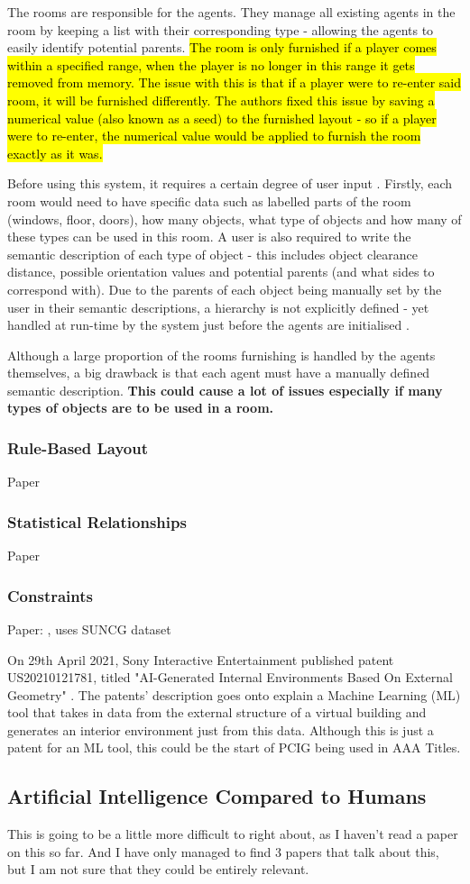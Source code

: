 The rooms are responsible for the agents. They manage all existing agents in the room by keeping a list with their corresponding type - allowing the agents to easily identify potential parents. \hl{The room is only furnished if a player comes within a specified range, when the player is no longer in this range it gets removed from memory. The issue with this is that if a player were to re-enter said room, it will be furnished differently. The authors fixed this issue by saving a numerical value (also known as a seed) to the furnished layout - so if a player were to re-enter, the numerical value would be applied to furnish the room exactly as it was.}

Before using this system, it requires a certain degree of user input \cite{real-time-walkthroughs}. Firstly, each room would need to have specific data such as labelled parts of the room (windows, floor, doors), how many objects, what type of objects and how many of these types can be used in this room.
A user is also required to write the semantic description of each type of object - this includes object clearance distance, possible orientation values and potential parents (and what sides to correspond with).
Due to the parents of each object being manually set by the user in their semantic descriptions, a hierarchy is not explicitly defined - yet handled at run-time by the system just before the agents are initialised \cite{real-time-walkthroughs}.

Although a large proportion of the rooms furnishing is handled by the agents themselves, a big drawback is that each agent must have a manually defined semantic description. \textbf{This could cause a lot of issues especially if many types of objects are to be used in a room.}

\subsubsection*{Rule-Based Layout}
Paper \cite{rule-based-layout}
\subsubsection*{Statistical Relationships}
Paper \cite{make-it-home}
\subsubsection*{Constraints}
Paper: \cite{constrained-layouts}, uses SUNCG dataset \cite{suncg}

\bigskip
On 29th April 2021, Sony Interactive Entertainment published patent US20210121781, titled "AI-Generated Internal Environments Based On External Geometry" \cite{sony-patent}. The patents' description goes onto explain a Machine Learning (ML) tool that takes in data from the external structure of a virtual building and generates an interior environment just from this data. Although this is just a patent for an ML tool, this could be the start of PCIG being used in AAA Titles. 

\subsection{Artificial Intelligence Compared to Humans}
This is going to be a little more difficult to right about, as I haven't read a paper on this so far. And I have only managed to find 3 papers that talk about this, but I am not sure that they could be entirely relevant.